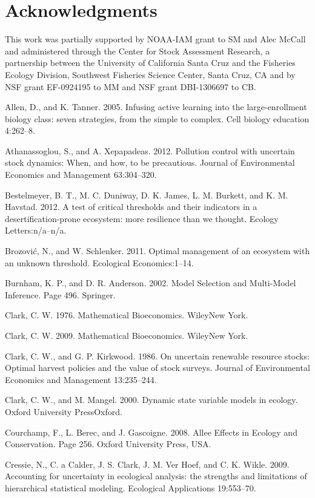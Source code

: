 \documentclass[author-year, 12pt,review]{components/elsarticle} %
\begin{document}
\section{Acknowledgments}\label{acknowledgments}

This work was partially supported by NOAA-IAM grant to SM and Alec
McCall and administered through the Center for Stock Assessment
Research, a partnership between the University of California Santa Cruz
and the Fisheries Ecology Division, Southwest Fisheries Science Center,
Santa Cruz, CA and by NSF grant EF-0924195 to MM and NSF grant
DBI-1306697 to CB.

Allen, D., and K. Tanner. 2005. Infusing active learning into the
large-enrollment biology class: seven strategies, from the simple to
complex. Cell biology education 4:262--8.

Athanassoglou, S., and A. Xepapadeas. 2012. Pollution control with
uncertain stock dynamics: When, and how, to be precautious. Journal of
Environmental Economics and Management 63:304--320.

Bestelmeyer, B. T., M. C. Duniway, D. K. James, L. M. Burkett, and K. M.
Havstad. 2012. A test of critical thresholds and their indicators in a
desertification-prone ecosystem: more resilience than we thought.
Ecology Letters:n/a--n/a.

Brozović, N., and W. Schlenker. 2011. Optimal management of an ecosystem
with an unknown threshold. Ecological Economics:1--14.

Burnham, K. P., and D. R. Anderson. 2002. Model Selection and
Multi-Model Inference. Page 496. Springer.

Clark, C. W. 1976. Mathematical Bioeconomics. WileyNew York.

Clark, C. W. 2009. Mathematical Bioeconomics. WileyNew York.

Clark, C. W., and G. P. Kirkwood. 1986. On uncertain renewable resource
stocks: Optimal harvest policies and the value of stock surveys. Journal
of Environmental Economics and Management 13:235--244.

Clark, C. W., and M. Mangel. 2000. Dynamic state variable models in
ecology. Oxford University PressOxford.

Courchamp, F., L. Berec, and J. Gascoigne. 2008. Allee Effects in
Ecology and Conservation. Page 256. Oxford University Press, USA.

Cressie, N., C. a Calder, J. S. Clark, J. M. {Ver Hoef}, and C. K.
Wikle. 2009. Accounting for uncertainty in ecological analysis: the
strengths and limitations of hierarchical statistical modeling.
Ecological Applications 19:553--70.
\end{document}
